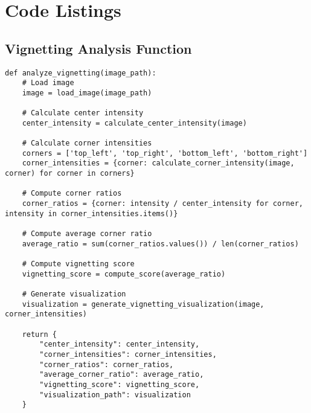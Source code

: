 \section{Code Listings}
\label{app:code_listings}

\subsection{Vignetting Analysis Function}
\label{lst:vignetting_code}
\begin{lstlisting}[style=jsonStyle, caption={Vignetting Analysis Function}, label={lst:vignetting_code}]
def analyze_vignetting(image_path):
    # Load image
    image = load_image(image_path)
    
    # Calculate center intensity
    center_intensity = calculate_center_intensity(image)
    
    # Calculate corner intensities
    corners = ['top_left', 'top_right', 'bottom_left', 'bottom_right']
    corner_intensities = {corner: calculate_corner_intensity(image, corner) for corner in corners}
    
    # Compute corner ratios
    corner_ratios = {corner: intensity / center_intensity for corner, intensity in corner_intensities.items()}
    
    # Compute average corner ratio
    average_ratio = sum(corner_ratios.values()) / len(corner_ratios)
    
    # Compute vignetting score
    vignetting_score = compute_score(average_ratio)
    
    # Generate visualization
    visualization = generate_vignetting_visualization(image, corner_intensities)
    
    return {
        "center_intensity": center_intensity,
        "corner_intensities": corner_intensities,
        "corner_ratios": corner_ratios,
        "average_corner_ratio": average_ratio,
        "vignetting_score": vignetting_score,
        "visualization_path": visualization
    }
\end{lstlisting}

